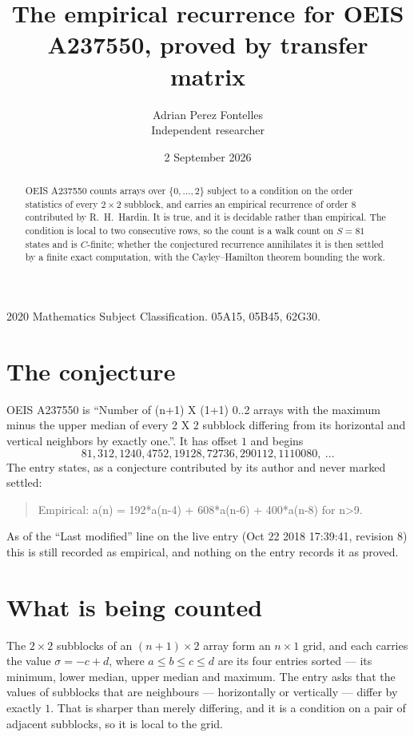 \documentclass[11pt,a4paper]{article}
\title{The empirical recurrence for OEIS A237550, proved by transfer matrix}
\author{Adrian Perez Fontelles\\ \small Independent researcher}
\date{2 September 2026}
\theoremstyle{plain}
\theoremstyle{definition}
\begin{document}
\maketitle

\begin{abstract}
OEIS A237550 counts arrays over $\{0,\dots,2\}$ subject to a condition on the order
statistics of every $2\times2$ subblock, and carries an empirical recurrence of order
$8$ contributed by R.~H.~Hardin. It is true, and it is decidable rather than empirical.
The condition is local to two consecutive rows, so the count is a walk count on $S=81$
states and is $C$-finite; whether the conjectured recurrence annihilates it is then settled by
a finite exact computation, with the Cayley--Hamilton theorem bounding the work.
\end{abstract}

\noindent\small 2020 Mathematics Subject Classification. 05A15, 05B45, 62G30.\normalsize

\section{The conjecture}

OEIS A237550 is ``Number of (n+1) X (1+1) 0..2 arrays with the maximum minus the upper median of every 2 X 2 subblock differing from its horizontal and vertical neighbors by exactly one.''. It has offset $1$ and begins
\[
81, 312, 1240, 4752, 19128, 72736, 290112, 1110080,\ \dots
\]
The entry states, as a conjecture contributed by its author and never marked settled:
\begin{quote}
Empirical: a(n) = 192*a(n-4) + 608*a(n-6) + 400*a(n-8) for n>9.
\end{quote}
As of the ``Last modified'' line on the live entry (Oct 22 2018 17:39:41, revision 8) this is still
recorded as empirical, and nothing on the entry records it as proved.

\section{What is being counted}

The $2\times2$ subblocks of an $(n+1)\times2$ array form an
$n\times1$ grid, and each carries the value $\sigma=-c+d$, where $a\le b\le c\le d$ are its four entries sorted --- its minimum, lower median, upper median and maximum. The entry asks that the values of
subblocks that are neighbours --- horizontally or vertically --- differ by exactly $1$.
That is sharper than merely differing, and it is a condition on a pair of adjacent subblocks,
so it is local to the grid.
\end{document}
